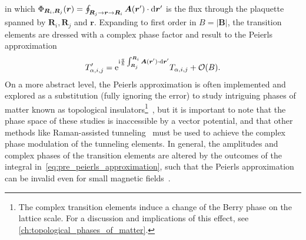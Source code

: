 in which $\Phi_{\bm R_i,\bm R_j}(\bm r) = \oint_{\bm R_j\rightarrow\bm r\rightarrow\bm R_i}\bm A(\bm r')\cdot\mathrm d \bm r'$ is the flux through the plaquette spanned by $\bm R_i, \bm R_j$ and $\bm r$.
Expanding to first order in $B=|\bm B|$, the transition elements are dressed with a complex phase factor and result to the Peierls approximation
\begin{align}
    T_{\alpha,i,j}'=\mathrm e^{\mathrm i\frac q\hbar\int_{\bm R_j}^{\bm R_i}\bm A(\bm r')\cdot\mathrm d\bm r'}T_{\alpha,i,j}+\mathcal O(B).
    \label{eq:peierls_substitution}
\end{align}
On a more abstract level, the Peierls approximation is often implemented and explored as a substitution (fully ignoring the error) to study intriguing phases of matter known as topological insulators\footnote{The complex transition elements induce a change of the Berry phase on the lattice scale. For a discussion and implications of this effect, see \cref{ch:topological_phases_of_matter}.}~\cite{Ozawa20192}, but it is important to note that the phase space of these studies is inaccessible by a vector potential, and that other methods like Raman-assisted tunneling~\cite{Garcia2012} must be used to achieve the complex phase modulation of the tunneling elements.
In general, the amplitudes and complex phases of the transition elements are altered by the outcomes of the integral in~\cref{eq:pre_peierls_approximation}, such that the Peierls approximation can be invalid even for small magnetic fields~\cite{Alexandrov1991,Julen2014}.

